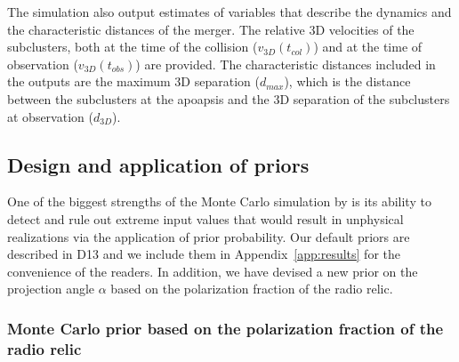 The simulation also output estimates of variables that describe
the dynamics and the characteristic distances of the merger. The relative
3D velocities of the subclusters, both at the time of the
collision ($v_{3D}(t_{col})$) and at the time of observation
($v_{3D}(t_{obs})$) are provided. The characteristic
distances included in the outputs are the maximum 3D separation ($d_{max}$),
which is the distance between the subclusters at
the apoapsis and the 3D separation of the subclusters at observation
($d_{3D}$). 
\subsection{Design and application of priors} 
\label{sec:priors}
%
One of the biggest strengths of the Monte Carlo simulation by  is its ability
to detect and rule out extreme input values that would result in
unphysical realizations via the application of prior probability. 
Our default priors are described in D13 and we include them in
Appendix~\ref{app:results} for the convenience of the readers. 
In addition, we have devised a new prior on the projection angle $\alpha$
based on the polarization fraction of the radio relic.

\subsubsection{Monte Carlo prior based on the polarization fraction of the radio relic}
%

